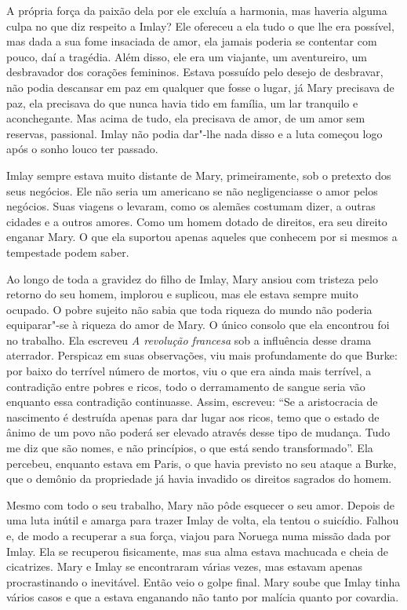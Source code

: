 A própria força da paixão dela por ele excluía a harmonia, mas haveria
alguma culpa no que diz respeito a Imlay? Ele ofereceu a ela tudo
o que lhe era possível, mas dada a sua fome insaciada de amor, ela
jamais poderia se contentar com pouco, daí a tragédia. Além disso, ele
era um viajante, um aventureiro, um desbravador dos corações femininos.
Estava possuído pelo desejo de desbravar, não podia descansar em paz
em qualquer que fosse o lugar, já Mary precisava de paz, ela precisava
do que nunca havia tido em família, um lar tranquilo e aconchegante. Mas
acima de tudo, ela precisava de amor, de um amor sem reservas,
passional. Imlay não podia dar"-lhe nada disso e a luta começou logo após
o sonho louco ter passado.

Imlay sempre estava muito distante de Mary, primeiramente, sob o
pretexto dos seus negócios. Ele não seria um americano se não negligenciasse o
amor pelos negócios. Suas viagens o levaram, como os alemães costumam
dizer, a outras cidades e a outros amores. Como um homem dotado de
direitos, era seu direito enganar Mary. O que ela suportou apenas
aqueles que conhecem por si mesmos a tempestade podem saber.

Ao longo de toda a gravidez do filho de Imlay, Mary ansiou com tristeza
pelo retorno do seu homem, implorou e suplicou, mas ele estava sempre muito ocupado.
O pobre sujeito não sabia que toda riqueza do mundo não poderia
equiparar"-se à riqueza do amor de Mary. O único consolo que ela
encontrou foi no trabalho. Ela escreveu \emph{A revolução francesa} sob
a influência desse drama aterrador. Perspicaz em suas observações,
viu mais profundamente do que Burke: por baixo do terrível número de
mortos, viu o que era ainda mais terrível, a contradição entre
pobres e ricos, todo o derramamento de sangue seria vão enquanto essa
contradição continuasse. Assim, escreveu: ``Se a aristocracia de
nascimento é destruída apenas para dar lugar aos ricos, temo que o estado de ânimo de um povo não poderá ser elevado através desse tipo de mudança. Tudo me diz que
são nomes, e não princípios, o que está sendo transformado''. Ela
percebeu, enquanto estava em Paris, o que havia previsto no seu ataque a
Burke, que o demônio da propriedade já havia invadido os direitos
sagrados do homem.

Mesmo com todo o seu trabalho, Mary não pôde esquecer o seu amor. Depois
de uma luta inútil e amarga para trazer Imlay de volta, ela tentou o
suicídio. Falhou e, de modo a recuperar a sua força, viajou para Noruega
numa missão dada por Imlay. Ela se recuperou fisicamente, mas sua alma
estava machucada e cheia de cicatrizes. Mary e Imlay se encontraram várias
vezes, mas estavam apenas procrastinando o inevitável. Então veio o
golpe final. Mary soube que Imlay tinha vários casos e que a estava
enganando não tanto por malícia quanto por covardia.

